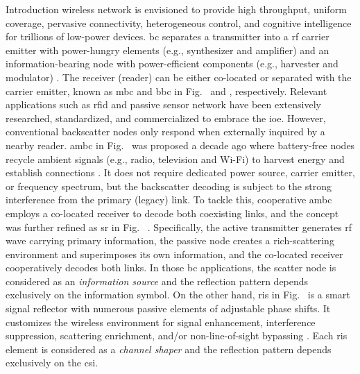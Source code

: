 \documentclass[journal]{IEEEtran}
\begin{document}
\begin{section}{Introduction}
	\label{sc:introduction}
	 wireless network is envisioned to provide high throughput, uniform coverage, pervasive connectivity, heterogeneous control, and cognitive intelligence for trillions of low-power devices.
	\gls{bc} separates a transmitter into a \gls{rf} carrier emitter with power-hungry elements (e.g., synthesizer and amplifier) and an information-bearing node with power-efficient components (e.g., harvester and modulator) \cite{Boyer2014}.
	The receiver (reader) can be either co-located or separated with the carrier emitter, known as \gls{mbc} and \gls{bbc} in Fig.~ and , respectively.
	Relevant applications such as \gls{rfid} \cite{Dobkin2012,Landt2005} and passive sensor network \cite{Vannucci2008,Assimonis2016} have been extensively researched, standardized, and commercialized to embrace the \gls{ioe}.
	However, conventional backscatter nodes only respond when externally inquired by a nearby reader.
	\gls{ambc} in Fig.~ was proposed a decade ago where battery-free nodes recycle ambient signals (e.g., radio, television and Wi-Fi) to harvest energy and establish connections \cite{Liu2013b}.
	It does not require dedicated power source, carrier emitter, or frequency spectrum, but the backscatter decoding is subject to the strong interference from the primary (legacy) link.
	To tackle this, cooperative \gls{ambc} \cite{Yang2018} employs a co-located receiver to decode both coexisting links, and the concept was further refined as \gls{sr} in Fig.~ \cite{Liang2020}.
	Specifically, the active transmitter generates \gls{rf} wave carrying primary information, the passive node creates a rich-scattering environment and superimposes its own information, and the co-located receiver cooperatively decodes both links.
	In those \gls{bc} applications, the scatter node is considered as an \emph{information source} and the reflection pattern depends exclusively on the information symbol.
	On the other hand, \gls{ris} in Fig.~ is a smart signal reflector with numerous passive elements of adjustable phase shifts.
	It customizes the wireless environment for signal enhancement, interference suppression, scattering enrichment, and/or non-line-of-sight bypassing \cite{Wu2021b}.
	Each \gls{ris} element is considered as a \emph{channel shaper} and the reflection pattern depends exclusively on the \gls{csi}.


\end{section}
\end{document}
